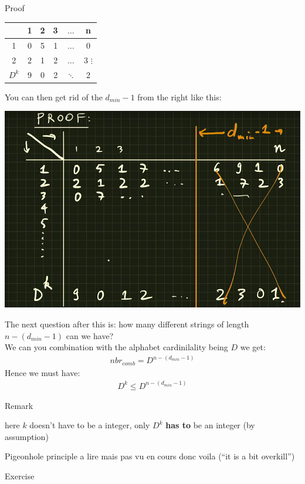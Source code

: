 \begin{parag}{Proof}
    \begin{center}
    \begin{tabular}{|c|c|c|c|c|c|}
        & 1 & 2 & 3 & $\ldots$ & n \\
        \hline
        1 & 0 & 5 & 1 &$\ldots$ & 0 \\
        \hline
        2 & 2 & 1 & 2 & $\ldots$ & 3
        $\vdots$ \\
        \hline
        $D^k$ &  9 & 0 & 2 & $\ddots$ & 2
    \end{tabular}
    \end{center}
    You can then get rid of the $d_{min} - 1$ from the right like this:
    \begin{center}
        \includegraphics[scale=0.3]{22025-04-30.png}
    \end{center}
    The next question after this is: how many different strings of length $n- \left(d_{min} - 1\right)$ can we have?\\
    We can you combination with the alphabet cardinilality being $D$ we get:
    \begin{align*} nbr_{comb} = D^{n - \left(d_{min} - 1\right)} \end{align*}
    Hence we must have:
    \begin{align*} D^k \leq D^{n-\left(d_{min}-1\right)} \end{align*}
    
    
    \begin{subparag}{Remark}
        \begin{framedremark}
            here $k$ doesn't have to be a integer, only $D^k$ \textbf{has to } be an integer (by assumption) 
        \end{framedremark}
        
        
    \end{subparag} 
\end{parag}

\begin{parag}{Pigeonhole principle}
   a lire mais pas vu en cours donc voila  (``it is a bit overkill'')
\end{parag}
\begin{parag}{Exercise}

    
\end{parag}








